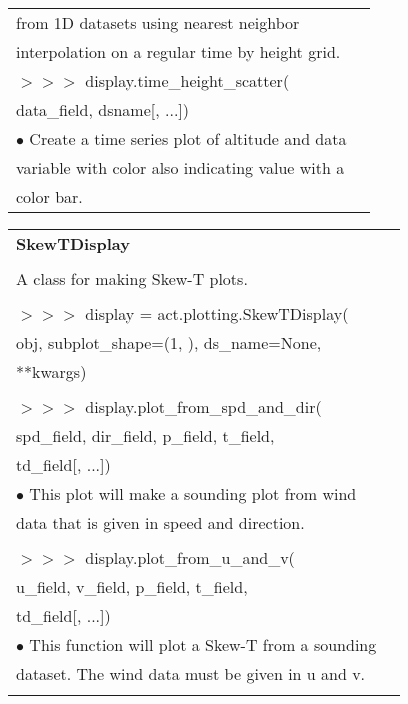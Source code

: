 \documentclass[potrait, z1paper, fontscale=0.33]{baposter} %
\begin{document}
\begin{poster}
{\begin{flushleft}
\begin{tabular}{@{}ll@{}}
\-\hspace{0.5cm} from 1D datasets using nearest neighbor\\
\-\hspace{0.5cm} interpolation on a regular time by height grid.\\
$>$$>$$>$ display.time\_height\_scatter(\\
\-\hspace{1.2cm} data\_field, dsname[, ...])\\
\-\hspace{0.2cm} $\bullet$ Create a time series plot of altitude and data\\
\-\hspace{0.5cm} variable with color also indicating value with a\\
\-\hspace{0.5cm} color bar.\\
\end{tabular}

\begin{tabular}{@{}ll@{}}
\\
\multicolumn{2}{l}{\cellcolor[HTML]{DDFFFF}\bf SkewTDisplay} \\
\\
A class for making Skew-T plots.\\
\\
$>$$>$$>$ display = act.plotting.SkewTDisplay(\\
\-\hspace{1.2cm} obj, subplot\_shape=(1, ), ds\_name=None,\\
\-\hspace{1.2cm} **kwargs)\\
\\
$>$$>$$>$ display.plot\_from\_spd\_and\_dir(\\
\-\hspace{1.2cm} spd\_field, dir\_field, p\_field, t\_field,\\
\-\hspace{1.2cm} td\_field[, ...])\\
\-\hspace{0.2cm} $\bullet$ This plot will make a sounding plot from wind\\
\-\hspace{0.5cm} data that is given in speed and direction.\\
\\
$>$$>$$>$ display.plot\_from\_u\_and\_v(\\
\-\hspace{1.2cm} u\_field, v\_field, p\_field, t\_field,\\
\-\hspace{1.2cm} td\_field[, ...])\\
\-\hspace{0.2cm} $\bullet$ This function will plot a Skew-T from a sounding\\
\-\hspace{0.5cm} dataset. The wind data must be given in u and v.\\
\\
\end{tabular}


\end{flushleft}}
\end{poster}
\end{document}
